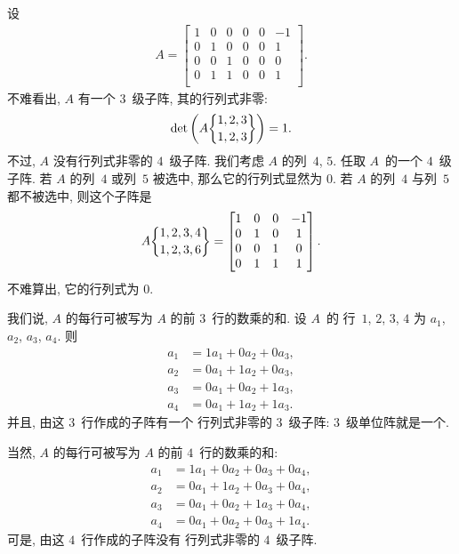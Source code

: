 \documentclass[../libro.tex]{subfiles}
\begin{document}
\begin{example}
    设
    \begin{align*}
        A =
        \begin{bmatrix}
            1 & 0 & 0 & 0 & 0 & -1 \\
            0 & 1 & 0 & 0 & 0 & 1  \\
            0 & 0 & 1 & 0 & 0 & 0  \\
            0 & 1 & 1 & 0 & 0 & 1  \\
        \end{bmatrix}.
    \end{align*}
    不难看出, \(A\) 有一个 \(3\)~级子阵, 其的行列式非零:
    \begin{align*}
        \det {\left(
                A\submat{1,2,3}{1,2,3}
        \right)} = 1.
    \end{align*}
    不过, \(A\) 没有行列式非零的 \(4\)~级子阵.
    我们考虑 \(A\) 的列~\(4\), \(5\).
    任取 \(A\)~的一个 \(4\)~级子阵.
    若 \(A\) 的列~\(4\) 或列~\(5\) 被选中,
    那么它的行列式显然为 \(0\).
    若 \(A\) 的列~\(4\) 与列~\(5\) 都不被选中,
    则这个子阵是
    \begin{align*}
        A\submat{1,2,3,4}{1,2,3,6} =
        \begin{bmatrix}
            1 & 0 & 0 & -1 \\
            0 & 1 & 0 & 1  \\
            0 & 0 & 1 & 0  \\
            0 & 1 & 1 & 1  \\
        \end{bmatrix}.
    \end{align*}
    不难算出, 它的行列式为 \(0\).

    我们说, \(A\) 的每行可被写为
    \(A\) 的前 \(3\)~行的数乘的和.
    设 \(A\)~的%
    行~\(1\), \(2\), \(3\), \(4\)
    为 \(a_1\), \(a_2\), \(a_3\), \(a_4\).
    则
    \begin{align*}
        a_1 & = 1a_1 + 0a_2 + 0a_3, \\
        a_2 & = 0a_1 + 1a_2 + 0a_3, \\
        a_3 & = 0a_1 + 0a_2 + 1a_3, \\
        a_4 & = 0a_1 + 1a_2 + 1a_3.
    \end{align*}
    并且, 由这 \(3\)~行作成的子阵有一个%
    行列式非零的 \(3\)~级子阵:
    \(3\)~级单位阵就是一个.

    当然,
    \(A\) 的每行可被写为
    \(A\) 的前 \(4\)~行的数乘的和:
    \begin{align*}
        a_1 & = 1a_1 + 0a_2 + 0a_3 + 0a_4, \\
        a_2 & = 0a_1 + 1a_2 + 0a_3 + 0a_4, \\
        a_3 & = 0a_1 + 0a_2 + 1a_3 + 0a_4, \\
        a_4 & = 0a_1 + 0a_2 + 0a_3 + 1a_4.
    \end{align*}
    可是, 由这 \(4\)~行作成的子阵没有%
    行列式非零的 \(4\)~级子阵.
\end{example}
\end{document}
